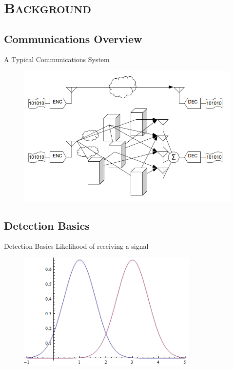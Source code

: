 \documentclass[xcolor=x11names,compress]{beamer}
\renewcommand{\(}{\begin{columns}}
\renewcommand{\)}{\end{columns}}
\newcommand{\<}[1]{\begin{column}{#1}}
\renewcommand{\>}{\end{column}}
\begin{document}
\section{\scshape Background}
\subsection{Communications Overview}
\begin{frame}{A Typical Communications System}
\begin{figure}[h!]
  \centering
    \includegraphics[width=\textwidth]{comms.png}
\end{figure}
\end{frame}

\subsection{Detection Basics}
\begin{frame}{Detection Basics}
Likelihood of receiving a signal
\begin{figure}[h!]
  \centering
    \includegraphics[width=0.8\textwidth]{../../plots/seminar_gaussian_sync.png}
\end{figure}
\end{frame}
\end{document}
